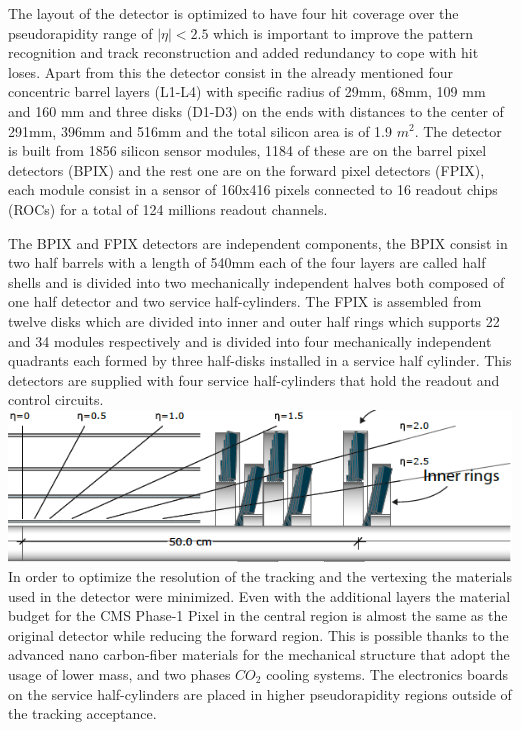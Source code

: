 The layout of the detector is optimized to have four hit coverage over the pseudorapidity range of  $|\eta| < 2.5$ which is important to improve the pattern recognition and track reconstruction and added redundancy to cope with hit loses. Apart from this the detector consist in the already mentioned four concentric barrel layers (L1-L4) with specific radius of 29mm, 68mm, 109 mm and 160 mm and three disks (D1-D3) on the ends with distances to the center of 291mm, 396mm and 516mm and the total silicon area is of 1.9 $m^{2}$. The detector is built from 1856 silicon sensor modules, 1184 of these are on the barrel pixel detectors (BPIX) and the rest one are on the forward pixel detectors (FPIX), each module consist in a sensor of 160x416 pixels connected to 16 readout chips (ROCs) for a total of 124 millions readout channels. \cite{pxd}

The BPIX and FPIX detectors are independent components, the BPIX consist in two half barrels with a length of 540mm each of the four layers are called half shells and is divided into two mechanically independent halves both composed of one half detector and two service half-cylinders. The FPIX is assembled from twelve disks which are divided into inner and outer half rings which supports 22 and 34 modules respectively and is divided into four mechanically independent quadrants each formed by three half-disks installed in a service half cylinder. This detectors are supplied with four service half-cylinders that hold the readout and control circuits.
\\
\includegraphics[scale=0.7]{pixeldetector.png}
\\
In order to optimize the resolution of the tracking and the vertexing the materials used in the detector were minimized. Even with the additional layers the material budget for the CMS Phase-1 Pixel in the central region is almost the same as the original detector while reducing the forward region. This is possible thanks to the advanced nano carbon-fiber materials for the mechanical structure that adopt the usage of lower mass, and two phases $CO_{2}$ cooling systems. The electronics boards on the service half-cylinders are placed in higher pseudorapidity regions outside of the tracking acceptance. 

